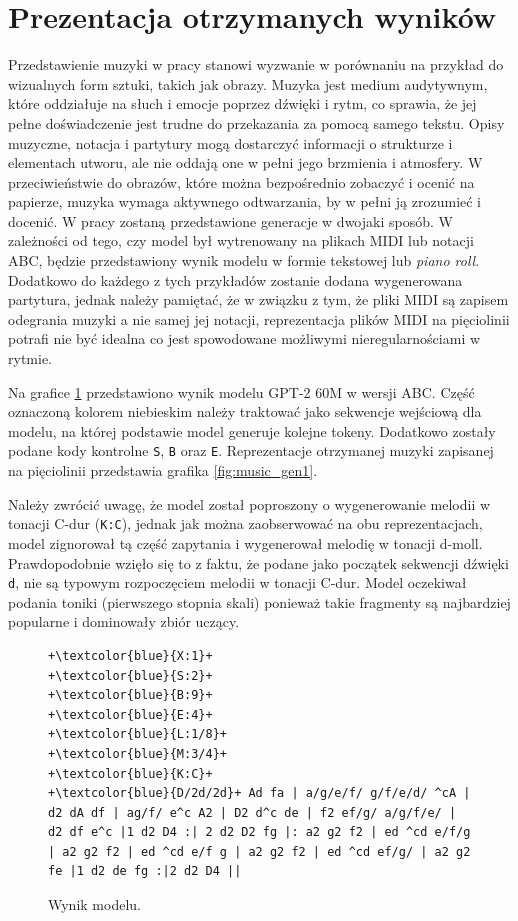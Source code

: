 \documentclass[data-science]{agh-wi} %
\begin{document}
\section{Prezentacja otrzymanych wyników}
Przedstawienie muzyki w pracy stanowi wyzwanie w porównaniu na przykład do wizualnych form sztuki, takich jak obrazy. Muzyka jest medium audytywnym, które oddziałuje na słuch i emocje poprzez dźwięki i rytm, co sprawia, że jej pełne doświadczenie jest trudne do przekazania za pomocą samego tekstu. Opisy muzyczne, notacja i partytury mogą dostarczyć informacji o strukturze i elementach utworu, ale nie oddają one w pełni jego brzmienia i atmosfery. W przeciwieństwie do obrazów, które można bezpośrednio zobaczyć i ocenić na papierze, muzyka wymaga aktywnego odtwarzania, by w pełni ją zrozumieć i docenić. W pracy zostaną przedstawione generacje w dwojaki sposób. W zależności od tego, czy model był wytrenowany na plikach MIDI lub notacji ABC, będzie przedstawiony wynik modelu w formie tekstowej lub \textit{piano roll}. Dodatkowo do każdego z tych przykładów zostanie dodana wygenerowana partytura, jednak należy pamiętać, że w związku z tym, że pliki MIDI są zapisem odegrania muzyki a nie samej jej notacji, reprezentacja plików MIDI na pięciolinii potrafi nie być idealna co jest spowodowane możliwymi nieregularnościami w rytmie.

Na grafice \ref*{code:music_gen1} przedstawiono wynik modelu GPT-2 60M w wersji ABC. Część oznaczoną kolorem niebieskim należy traktować jako sekwencje wejściową dla modelu, na której podstawie model generuje kolejne tokeny. Dodatkowo zostały podane kody kontrolne \texttt{S}, \texttt{B} oraz \texttt{E}. Reprezentacje otrzymanej muzyki zapisanej na pięciolinii przedstawia grafika \ref*{fig:music_gen1}.

Należy zwrócić uwagę, że model został poproszony o wygenerowanie melodii w tonacji C-dur (\texttt{K:C}), jednak jak można zaobserwować na obu reprezentacjach, model zignorował tą część zapytania i wygenerował melodię w tonacji d-moll. Prawdopodobnie wzięło się to z faktu, że podane jako początek sekwencji dźwięki \texttt{d}, nie są typowym rozpoczęciem melodii w tonacji C-dur. Model oczekiwał podania toniki (pierwszego stopnia skali) ponieważ takie fragmenty są najbardziej popularne i dominowały zbiór uczący. 

\begin{figure}[ht!]
    \begin{verbatim}
+\textcolor{blue}{X:1}+
+\textcolor{blue}{S:2}+
+\textcolor{blue}{B:9}+
+\textcolor{blue}{E:4}+
+\textcolor{blue}{L:1/8}+
+\textcolor{blue}{M:3/4}+
+\textcolor{blue}{K:C}+
+\textcolor{blue}{D/2d/2d}+ Ad fa | a/g/e/f/ g/f/e/d/ ^cA | d2 dA df | ag/f/ e^c A2 | D2 d^c de | f2 ef/g/ a/g/f/e/ | d2 df e^c |1 d2 D4 :| 2 d2 D2 fg |: a2 g2 f2 | ed ^cd e/f/g | a2 g2 f2 | ed ^cd e/f g | a2 g2 f2 | ed ^cd ef/g/ | a2 g2 fe |1 d2 de fg :|2 d2 D4 ||
    \end{verbatim}
    \caption{Wynik modelu.}\label{code:music_gen1}
\end{figure}
\end{document}
